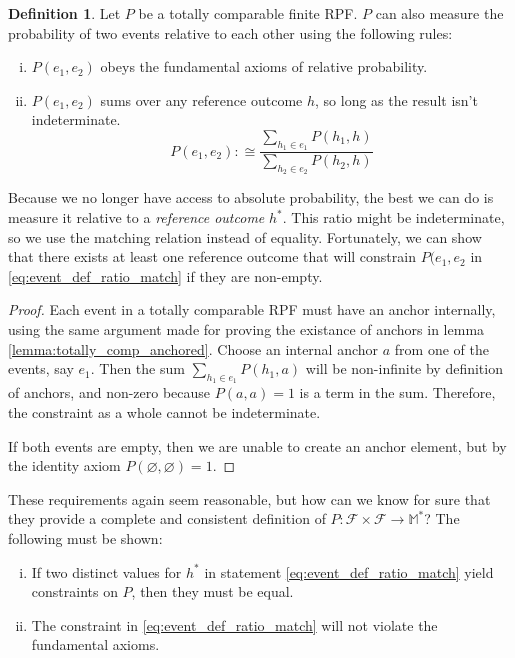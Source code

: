 \documentclass[twoside]{article}
\theoremstyle{plain}%
\theoremstyle{definition}
\newtheorem{definition}{Definition}[section]
\theoremstyle{remark}
\begin{document}
\begin{definition}
Let \(P\) be a totally comparable finite RPF. \(P\) can also measure the probability of two events relative to each other using the following rules:

\begin{enumerate}[(i)]
  \item \label{event_def_1} \(P(e_1, e_2)\) obeys the fundamental axioms of relative probability.
  \item \label{event_def_2} \(P(e_1, e_2)\) sums over any reference outcome \(h\), so long as the result isn't indeterminate.
    \begin{equation}
      \label{eq:event_def_ratio_match}
      P(e_1, e_2) :\cong \frac{\sum_{h_1 \in e_1} P(h_1, h)}{\sum_{h_2 \in e_2} P(h_2, h)}
    \end{equation}
\end{enumerate}
\end{definition}

Because we no longer have access to absolute probability, the best we can do is measure it relative to a \textit{reference outcome} \(h^*\). This ratio might be indeterminate, so we use the matching relation instead of equality. Fortunately, we can show that there exists at least one reference outcome that will constrain \(P(e_1, e_2\) in \ref{eq:event_def_ratio_match} if they are non-empty.

\begin{proof}
Each event in a totally comparable RPF must have an anchor internally, using the same argument made for proving the existance of anchors in lemma \ref{lemma:totally_comp_anchored}. Choose an internal anchor \(a\) from one of the events, say \(e_1\). Then the sum \(\sum_{h_1 \in e_1} P(h_1, a)\) will be non-infinite by definition of anchors, and non-zero because \(P(a, a) = 1\) is a term in the sum. Therefore, the constraint as a whole cannot be indeterminate.

If both events are empty, then we are unable to create an anchor element, but by the identity axiom \(P(\varnothing, \varnothing) = 1\).
\end{proof}

These requirements again seem reasonable, but how can we know for sure that they provide a complete and consistent definition of \(P: \mathcal{F} \times \mathcal{F} \rightarrow \mathbb{M}^*\)? The following must be shown:

\begin{enumerate}[(i)]
  \item \label{event_def_proof_1} If two distinct values for \(h^*\) in statement \ref{eq:event_def_ratio_match} yield constraints on \(P\), then they must be equal.
  \item \label{event_def_proof_2} The constraint in \ref{eq:event_def_ratio_match} will not violate the fundamental axioms.
\end{enumerate}
\end{document}
